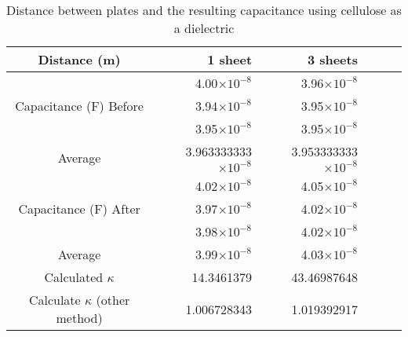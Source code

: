 \documentclass [12pt, letterpaper, twoside] {article}
\begin{document}
\begin{table}[h!]
  \centering
  \begin{tabular}{| c | r | r | r | r | r |}
    \hline\hline
    Distance (m) & 1 sheet & 3 sheets \\
    \hline
    \multirow {3}{*}{Capacitance (F) Before} & 4.00\(\times10^{-8}\) & 3.96\(\times10^{-8}\) \\
    & 3.94\(\times10^{-8}\) & 3.95\(\times10^{-8}\) \\
    & 3.95\(\times10^{-8}\) & 3.95\(\times10^{-8}\) \\
    \hline
    Average & 3.963333333\(\times10^{-8}\) & 3.953333333\(\times10^{-8}\) \\
    \hline
    \multirow {3}{*}{Capacitance (F) After} & 4.02\(\times10^{-8}\) & 4.05\(\times10^{-8}\) \\
    & 3.97\(\times10^{-8}\) & 4.02\(\times10^{-8}\) \\
    & 3.98\(\times10^{-8}\) & 4.02\(\times10^{-8}\) \\
    \hline
    Average & 3.99\(\times10^{-8}\) & 4.03\(\times10^{-8}\) \\
    \hline
    Calculated \(\kappa\) & 14.3461379 & 43.46987648 \\
    \hline
    Calculate \(\kappa\) (other method) & 1.006728343 & 1.019392917 \\
    \hline\hline
  \end{tabular}
  \caption{Distance between plates and the resulting capacitance using cellulose as a dielectric}
\end{table}
\end{document}
